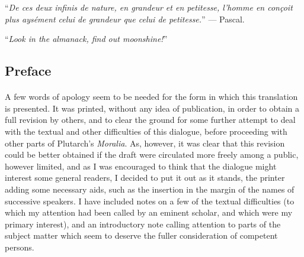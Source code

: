 \documentclass[a4paper, 11pt, oneside, polutonikogreek, english]{article}
\begin{document}
\setlength{\parskip}{1mm plus1mm minus1mm}
\clearpage
\tableofcontents
\clearpage
\vspace*{\fill}
\begin{center}
``\emph{De ces deux infinis de nature, en grandeur et en petitesse, l'homme en conçoit plus aysément celui de grandeur que celui de petitesse.}'' --- Pascal.

\bigskip

``\emph{Look in the almanack, find out moonshine!}''
\end{center}
\vspace*{\fill}
\clearpage
\subsection*{Preface}
\paragraph{}
A few words of apology seem to be needed for the form in which this translation is presented. It was printed, without any idea of publication, in order to obtain a full revision by others, and to clear the ground for some further attempt to deal with the textual and other difficulties of this dialogue, before proceeding with other parts of Plutarch's \emph{Moralia}. As, however, it was clear that this revision could be better obtained if the draft were circulated more freely among a public, however limited, and as I was encouraged to think that the dialogue might interest some general readers, I decided to put it out as it stands, the printer adding some necessary aids, such as the insertion in the margin of the names of successive speakers. I have included notes on a few of the textual difficulties (to which my attention had been called by an eminent scholar, and which were my primary interest), and an introductory note calling attention to parts of the subject matter which seem to deserve the fuller consideration of competent persons. 
\end{document}
